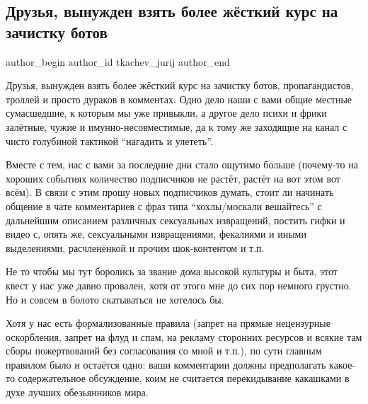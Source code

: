  
 
 
 
 
 
\subsection{Друзья, вынужден взять более жёсткий курс на зачистку ботов}
\label{sec:23_02_2022.tg.tkachev_jurij.1.boty}
 
\ifcmt
 author_begin
   author_id tkachev_jurij
 author_end
\fi

Друзья, вынужден взять более жёсткий курс на зачистку ботов, пропагандистов,
троллей и просто дураков в комментах. Одно дело наши с вами общие местные
сумасшедшие, к которым мы уже привыкли, а другое дело психи и фрики залётные,
чужие и имунно-несовместимые, да к тому же заходящие на канал с чисто голубиной
тактикой \enquote{нагадить и улететь}. 

Вместе с тем, нас с вами за последние дни стало ощутимо больше (почему-то на
хороших событиях количество подписчиков не растёт, растёт на вот этом вот
всём). В связи с этим прошу новых подписчиков думать, стоит ли начинать общение
в чате комментариев с фраз типа \enquote{хохлы/москали вешайтесь} с дальнейшим
описанием различных сексуальных извращений, постить гифки и видео с, опять же,
сексуальными извращениями, фекалиями и иными выделениями, расчленёнкой и прочим
шок-контентом и т.п.

Не то чтобы мы тут боролись за звание дома высокой культуры и быта, этот квест
у нас уже давно провален, хотя от этого мне до сих пор немного грустно. Но и
совсем в болото скатываться не хотелось бы.

Хотя у нас есть формализованные правила (запрет на прямые нецензурные
оскорбления, запрет на флуд и спам, на рекламу сторонних ресурсов и всякие там
сборы пожертвований без согласования со мной и т.п.), по сути главным правилом
было и остаётся одно: ваши комментарии должны предполагать какое-то
содержательное обсуждение, коим не считается перекидывание какашками в духе
лучших обезьянников мира.
